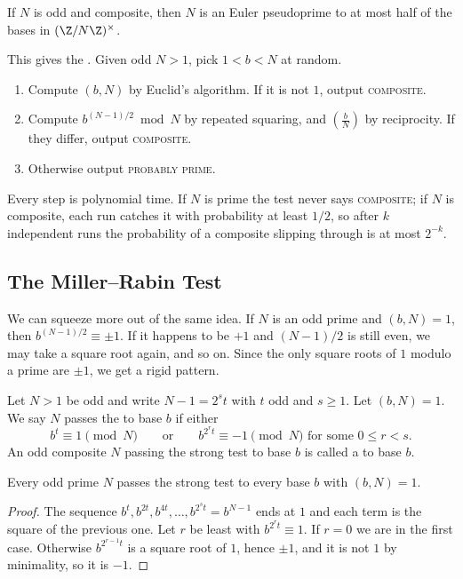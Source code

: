 \begin{corollary}
	If $N$ is odd and composite, then $N$ is an Euler pseudoprime to at most half of the bases in $(\Z/N\Z)^\times$.
\end{corollary}

This gives the . Given odd $N > 1$, pick $1 < b < N$ at random.
\begin{enumerate}[label=(\arabic*)]
	\item Compute $(b, N)$ by Euclid's algorithm. If it is not $1$, output \textsc{composite}.
	\item Compute $b^{(N-1)/2}\bmod N$ by repeated squaring, and $\left( \frac bN\right)$ by reciprocity. If they differ, output \textsc{composite}.
	\item Otherwise output \textsc{probably prime}.
\end{enumerate}
Every step is polynomial time. If $N$ is prime the test never says \textsc{composite}; if $N$ is composite, each run catches it with probability at least $1/2$, so after $k$ independent runs the probability of a composite slipping through is at most $2^{-k}$.

\subsection{The Miller--Rabin Test}

We can squeeze more out of the same idea. If $N$ is an odd prime and $(b, N) = 1$, then $b^{(N-1)/2}\equiv\pm1$. If it happens to be $+1$ and $(N-1)/2$ is still even, we may take a square root again, and so on. Since the only square roots of $1$ modulo a prime are $\pm1$, we get a rigid pattern.

\begin{definition}
	Let $N > 1$ be odd and write $N - 1 = 2^st$ with $t$ odd and $s \geq 1$. Let $(b, N) = 1$. We say $N$ passes the  to base $b$ if either
	$$
	b^t \equiv 1 \pmod N \qquad \text{or} \qquad b^{2^rt}\equiv-1\pmod N \text{ for some } 0 \leq r < s.
	$$
	An odd composite $N$ passing the strong test to base $b$ is called a  to base $b$.
\end{definition}

\begin{proposition}
	Every odd prime $N$ passes the strong test to every base $b$ with $(b,N) = 1$.
\end{proposition}
\begin{proof}
	The sequence $b^t, b^{2t}, b^{4t}, \dots, b^{2^st} = b^{N-1}$ ends at $1$ and each term is the square of the previous one. Let $r$ be least with $b^{2^rt} \equiv 1$. If $r = 0$ we are in the first case. Otherwise $b^{2^{r-1}t}$ is a square root of $1$, hence $\pm1$, and it is not $1$ by minimality, so it is $-1$.
\end{proof}

